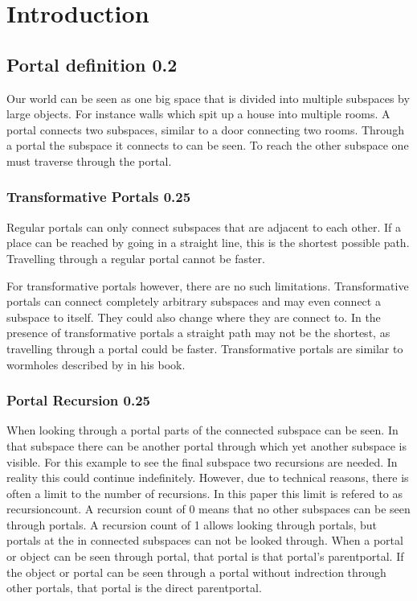 
\section{Introduction}

\subsection{Portal definition 0.2}
Our world can be seen as one big space that is divided into multiple subspaces by large objects. For instance walls which spit up a house into multiple rooms. A portal connects two subspaces, similar to a door connecting two rooms. Through a portal the subspace it connects to can be seen. To reach the other subspace one must traverse through the portal.

\subsubsection{Transformative Portals 0.25}
Regular portals can only connect subspaces that are adjacent to each other. If a place can be reached by going in a straight line, this is the shortest possible path. Travelling through a regular portal cannot be faster.

For transformative portals however, there are no such limitations. Transformative portals can connect completely arbitrary subspaces and may even connect a subspace to itself. They could also change where they are connect to. In the presence of transformative portals a straight path may not be the shortest, as travelling through a portal could be faster. Transformative portals are similar to wormholes described by \textcite{Visser:Wormholes} in his book.

\subsubsection{Portal Recursion 0.25}
When looking through a portal parts of the connected subspace can be seen. In that subspace there can be another portal through which yet another subspace is visible. For this example to see the final subspace two recursions are needed. In reality this could continue indefinitely. However, due to technical reasons, there is often a limit to the number of recursions. In this paper this limit is refered to as \gls{recursioncount}. A recursion count of 0 means that no other subspaces can be seen through portals. A recursion count of 1 allows looking through portals, but portals at the in connected subspaces can not be looked through. When a portal or object can be seen through portal, that portal is that portal's \gls{parentportal}. If the object or portal can be seen through a portal without indrection through other portals, that portal is the direct \gls{parentportal}.

